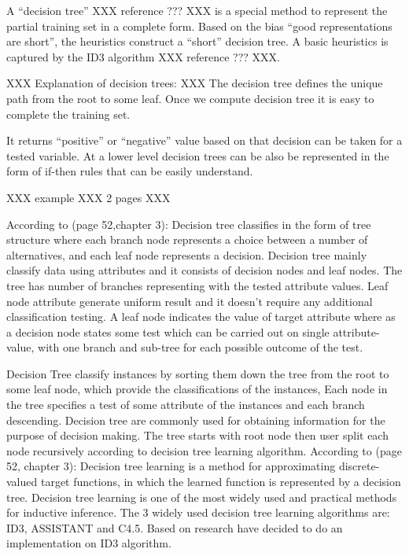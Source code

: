 \documentclass{report}
\begin{document}
A ``decision tree'' XXX reference ??? XXX is a special method to represent the partial training set in a complete form. Based on the bias ``good representations are short'', the heuristics construct a ``short'' decision tree. A basic heuristics is captured by the ID3 algorithm XXX reference ??? XXX.

XXX Explanation of decision trees: XXX  The decision tree defines the unique path from the root to some leaf. Once we compute decision tree it is easy to complete the training set. 

It returns ``positive'' or ``negative'' value based on that decision can be taken for a tested variable. At a lower level decision trees can be also be represented in the form of if-then rules that can be easily understand.

XXX example XXX 2 pages XXX

According to \cite{Mitchell1997MachineLearning}(page 52,chapter 3): Decision tree classifies in the form of tree structure where each branch node represents a choice between a number of alternatives, and each leaf node represents a decision. Decision tree mainly classify data using attributes and it consists of decision nodes and leaf nodes. The tree has number of branches representing with the tested attribute values. Leaf node attribute generate uniform result and it doesn't require any additional classification testing. A leaf node indicates the value of target attribute where as a decision node states some test which can be carried out on single attribute-value, with one branch and sub-tree for each possible outcome of the test.

Decision Tree classify instances by sorting them down the tree from the root to some leaf node, which provide the classifications of the instances, Each node in the tree specifies a test of some attribute of the instances and each branch descending.
Decision tree are commonly used for obtaining information for the purpose of decision making. The tree starts with root node then user split each node recursively according to decision tree learning algorithm.
According to \cite{Mitchell1997MachineLearning}(page 52, chapter 3): Decision tree learning is a method for approximating discrete-valued target functions, in which the learned function is represented by a decision tree. Decision tree learning is one of the most widely used and practical methods for inductive inference. The 3 widely used decision tree learning algorithms are: ID3, ASSISTANT and C4.5. Based on research have decided to do an implementation on ID3 algorithm. 
\end{document}

